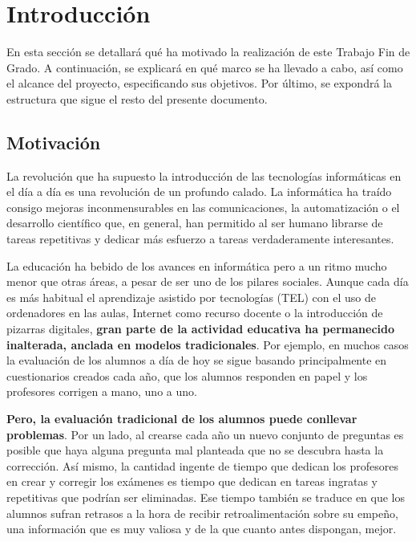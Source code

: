 \chapter{Introducción \label{sec:introduccion}}

En esta sección se detallará qué ha motivado la realización de este Trabajo Fin de Grado. A continuación, se explicará en qué marco se ha llevado a cabo, así como el alcance del proyecto, especificando sus objetivos. Por último, se expondrá  la estructura que sigue el resto del presente documento.

\section{Motivación}


La revolución que ha supuesto la introducción de las tecnologías informáticas en el día a día es una revolución de un profundo calado. La informática ha traído consigo mejoras inconmensurables en las comunicaciones, la automatización o el desarrollo científico que, en general, han permitido al ser humano librarse de tareas repetitivas y dedicar más esfuerzo a tareas verdaderamente interesantes.

La educación ha bebido de los avances en informática pero a un ritmo mucho menor que otras áreas, a pesar de ser uno de los pilares sociales. Aunque cada día es más habitual el aprendizaje asistido por tecnologías (\acrshort{TEL}) con el uso de ordenadores en las aulas, Internet como recurso docente o la introducción de pizarras digitales, \textbf{gran parte de la actividad educativa ha permanecido inalterada, anclada en modelos tradicionales}. Por ejemplo, en muchos casos la evaluación de los alumnos a día de hoy se sigue basando principalmente en cuestionarios creados cada año, que los alumnos responden en papel y los profesores corrigen a mano, uno a uno.

\textbf{Pero, la evaluación tradicional de los alumnos puede conllevar problemas}. Por un lado, al crearse cada año un nuevo conjunto de preguntas es posible que haya alguna pregunta mal planteada que no se descubra hasta la corrección. Así mismo, la cantidad ingente de tiempo que dedican los profesores en crear y corregir los exámenes es tiempo que dedican en tareas ingratas y repetitivas que podrían ser eliminadas. Ese tiempo también se traduce en que los alumnos sufran retrasos a la hora de recibir retroalimentación sobre su empeño, una información que es muy valiosa y de la que cuanto antes dispongan, mejor.

